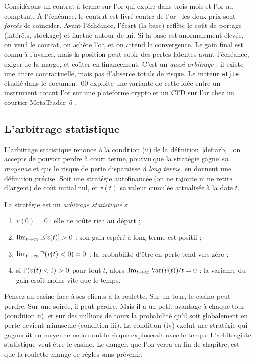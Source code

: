 \documentclass[11pt,a4paper]{article}
\begin{document}
Considérons un contrat à terme sur l'or qui expire dans trois mois et l'or au comptant. À l'échéance, le contrat est livré contre de l'or : les deux prix sont \emph{forcés} de coïncider. Avant l'échéance, l'écart (la \og base\fg) reflète le coût de portage (intérêts, stockage) et fluctue autour de lui. Si la base est anormalement élevée, on vend le contrat, on achète l'or, et on attend la convergence. Le gain final est connu à l'avance, mais la position peut subir des pertes latentes avant l'échéance, exiger de la marge, et coûter en financement. C'est un \emph{quasi-arbitrage} : il existe une ancre contractuelle, mais pas d'absence totale de risque. Le moteur \texttt{atjte} étudié dans le document~00 exploite une variante de cette idée entre un instrument cotant l'or sur une plateforme crypto et un CFD sur l'or chez un courtier MetaTrader~5 \citep{atjte}.

\subsection{L'arbitrage statistique}

L'arbitrage statistique renonce à la condition (ii) de la définition~\ref{def:arb} : on accepte de pouvoir perdre à court terme, pourvu que la stratégie gagne \emph{en moyenne} et que le risque de perte disparaisse \emph{à long terme}. \citet{hogan2004} en donnent une définition précise. Soit une stratégie autofinancée (on ne rajoute ni ne retire d'argent) de coût initial nul, et $v(t)$ sa valeur cumulée actualisée à la date $t$.

\begin{definition}\label{def:statarb}
La stratégie est un \emph{arbitrage statistique} si
\begin{enumerate}[label=(\roman*)]
\item $v(0) = 0$ : elle ne coûte rien au départ ;
\item $\lim_{t\to\infty}\mathbb{E}[v(t)] > 0$ : son gain espéré à long terme est positif ;
\item $\lim_{t\to\infty}\mathbb{P}(v(t) < 0) = 0$ : la probabilité d'être en perte tend vers zéro ;
\item si $\mathbb{P}(v(t)<0) > 0$ pour tout $t$, alors $\lim_{t\to\infty}\operatorname{Var}(v(t))/t = 0$ : la variance du gain croît moins vite que le temps.
\end{enumerate}
\end{definition}

\begin{intuition}
Pensez au casino face à ses clients à la roulette. Sur un tour, le casino peut perdre. Sur une soirée, il peut perdre. Mais il a un petit avantage à chaque tour (condition ii), et sur des millions de tours la probabilité qu'il soit globalement en perte devient minuscule (condition iii). La condition (iv) exclut une stratégie qui gagnerait en moyenne mais dont le risque exploserait avec le temps. L'arbitragiste statistique veut être le casino. Le danger, que l'on verra en fin de chapitre, est que la roulette change de règles sans prévenir.
\end{intuition}
\end{document}
